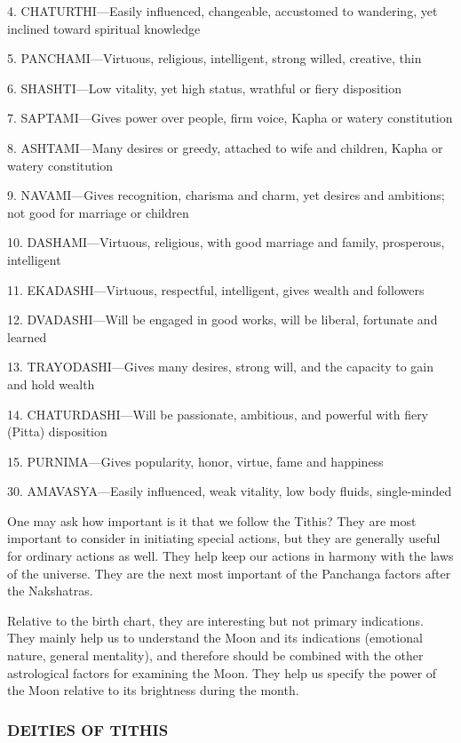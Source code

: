 4.    CHATURTHI—Easily influenced, changeable, accustomed to wandering, yet inclined toward spiritual knowledge

5.    PANCHAMI—Virtuous, religious, intelligent, strong willed, creative, thin

6.    SHASHTI—Low vitality, yet high status, wrathful or fiery disposition

7.    SAPTAMI—Gives power over people, firm voice, Kapha or watery constitution

8.    ASHTAMI—Many desires or greedy, attached to wife and children, Kapha or watery constitution

9.    NAVAMI—Gives recognition, charisma and charm, yet desires and ambitions; not good for marriage or children

10. DASHAMI—Virtuous, religious, with good marriage and family, prosperous, intelligent

11. EKADASHI—Virtuous, respectful, intelligent, gives wealth and followers

12. DVADASHI—Will be engaged in good works, will be liberal, fortunate and learned

13. TRAYODASHI—Gives many desires, strong will, and the capacity to gain and hold wealth

14. CHATURDASHI—Will be passionate, ambitious, and powerful with fiery (Pitta) disposition

15. PURNIMA—Gives popularity, honor, virtue, fame and happiness

30. AMAVASYA—Easily influenced, weak vitality, low body fluids, single-minded

 

One may ask how important is it that we follow the Tithis? They are most important to consider in initiating special actions, but they are generally useful for ordinary actions as well. They help keep our actions in harmony with the laws of the universe. They are the next most important of the Panchanga factors after the Nakshatras.

Relative to the birth chart, they are interesting but not primary indications. They mainly help us to understand the Moon and its indications (emotional nature, general mentality), and therefore should be combined with the other astrological factors for examining the Moon. They help us specify the power of the Moon relative to its brightness during the month.

 

\subsubsection{DEITIES OF TITHIS}
 

